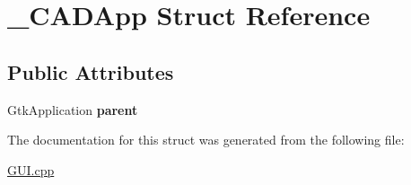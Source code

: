 \hypertarget{struct___c_a_d_app}{}\section{\+\_\+\+C\+A\+D\+App Struct Reference}
\label{struct___c_a_d_app}
\subsection*{Public Attributes}
\begin{DoxyCompactItemize}
\item 
\mbox{\label{struct___c_a_d_app_a6f8614d67ce363c758efe770ba819ddc}} 
Gtk\+Application {\bfseries parent}
\end{DoxyCompactItemize}


The documentation for this struct was generated from the following file\+:\begin{DoxyCompactItemize}
\item 
\mbox{\hyperlink{_g_u_i_8cpp}{G\+U\+I.\+cpp}}\end{DoxyCompactItemize}
